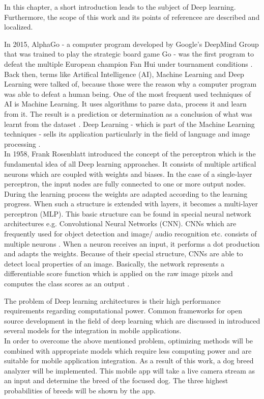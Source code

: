 In this chapter, a short introduction leads to the subject of Deep learning. Furthermore, the scope of this work and its points of referencee are described and localized.

		
In 2015, AlphaGo - a computer program developed by Google's DeepMind Group that was trained to play the strategic board game Go - was the first program to defeat the multiple European champion Fan Hui under tournament conditions \citep{DeepMind}. Back then, terms like Artifical Intelligence (AI), Machine Learning and Deep Learning were talked of, because those were the reason why a computer program was able to defeat a human being. One of the most frequent used techniques of AI is Machine Learning. It uses algorithms to parse data, process it and learn from it. The result is a prediction or determination as a conclusion of what was learnt from the dataset \citep{NVIDIA-MichaelCopeland2016}. Deep Learning - which is part of the Machine Learning techniques - sells its application particularly in the field of language and image processing \citep{Wick2017}. \\

In 1958, Frank Rosenblatt introduced the concept of the perceptron which is the fundamental idea of all Deep learning approaches. It consists of multiple artifical neurons which are coupled with weights and biases. In the case of a single-layer perceptron, the input nodes are fully connected to one or more output nodes. During the learning process the weights are adapted according to the learning progress. When such a structure is extended with layers, it becomes a multi-layer perceptron (MLP). This basic structure can be found in special neural network architectures e.g. Convolutional Neural Networks (CNN). CNNs which are frequently used for object detection and image/ audio recognition etc. consists of multiple neurons \citep{Wick2017}. When a neuron receives an input, it performs a dot production and adapts the weights. Because of their special structure, CNNs are able to detect local properties of an image. Basically, the network represents a differentiable score function which is applied on the raw image pixels and computes the class scores as an output \citep{UniversityOfStanford}.
 
The problem of Deep learning architectures is their high performance requirements regarding computational power. Common frameworks for open source development in the field of deep learning which are discussed in  introduced several models for the integration in mobile applications. \\

In order to overcome the above mentioned problem, optimizing methods will be combined with appropriate models which require less computing power and are suitable for mobile application integration. As a result of this work, a dog breed analyzer will be implemented. This mobile app will take a live camera stream as an input and determine the breed of the focused dog. The three highest probabilities of breeds will be shown by the app.

	